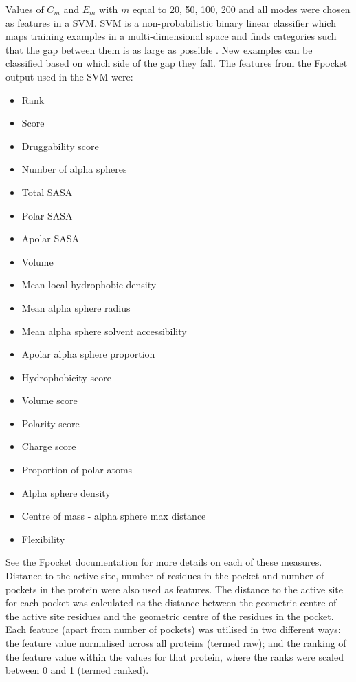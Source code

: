 Values of $C_{m}$ and $E_{m}$ with $m$ equal to 20, 50, 100, 200 and all modes were chosen as features in a SVM.
SVM is a non-probabilistic binary linear classifier which maps training examples in a multi-dimensional space and finds categories such that the gap between them is as large as possible \cite{Cortes1995}.
New examples can be classified based on which side of the gap they fall.
The features from the Fpocket output used in the SVM were:
\begin{itemize}
\item Rank
\item Score
\item Druggability score
\item Number of alpha spheres
\item Total SASA
\item Polar SASA
\item Apolar SASA
\item Volume
\item Mean local hydrophobic density
\item Mean alpha sphere radius
\item Mean alpha sphere solvent accessibility
\item Apolar alpha sphere proportion
\item Hydrophobicity score
\item Volume score
\item Polarity score
\item Charge score
\item Proportion of polar atoms
\item Alpha sphere density
\item Centre of mass - alpha sphere max distance
\item Flexibility
\end{itemize}

See the Fpocket documentation for more details on each of these measures.
Distance to the active site, number of residues in the pocket and number of pockets in the protein were also used as features.
The distance to the active site for each pocket was calculated as the distance between the geometric centre of the active site residues and the geometric centre of the residues in the pocket.
Each feature (apart from number of pockets) was utilised in two different ways: the feature value normalised across all proteins (termed raw); and the ranking of the feature value within the values for that protein, where the ranks were scaled between 0 and 1 (termed ranked).

